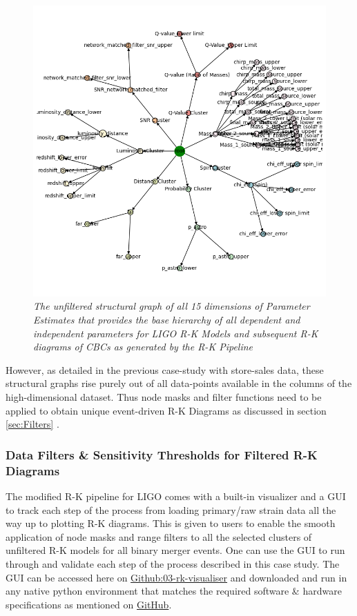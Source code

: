     \begin{figure}[H]
        \centering
        \includegraphics[width=1.0\linewidth]{images/ligo_structural_graph.png}
        \caption{\textit{The unfiltered structural graph of all 15 dimensions of Parameter Estimates that provides the base hierarchy  of all dependent and independent parameters for LIGO R-K Models and subsequent R-K diagrams of CBCs as generated by the R-K Pipeline}}
        \label{fig:LIGO12_PlaceHolder_fig}
    \end{figure}
    
However, as detailed in the previous case-study with store-sales data, these structural graphs rise purely out of all data-points available in the columns of the high-dimensional dataset. Thus node masks and filter functions need to be applied to obtain unique event-driven R-K Diagrams as discussed in section \ref{sec:Filters} .

\subsubsection{Data Filters \& Sensitivity Thresholds for Filtered R-K Diagrams}

The modified R-K pipeline for LIGO comes with a built-in visualizer and a GUI to track each step of the process from loading primary/raw strain data all the way up to plotting R-K diagrams. This is given to users to enable the smooth application of node masks and range filters to all the selected clusters of unfiltered R-K models for all binary merger events. One can use the GUI to run through and validate each step of the process described in this case study. The GUI can be accessed here on \href{https://github.com/animikhroy/rk_toolkit_pipeline_diagrams/tree/main/03_rk-visualizer}{Github:03-rk-visualiser} and downloaded and run in any native python environment that matches the required software \& hardware specifications as mentioned on \href{https://github.com/animikhroy/rk_toolkit_pipeline_diagrams/tree/main}{GitHub}.

